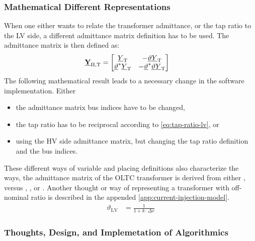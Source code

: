 \subsubsection{Mathematical Different Representations}
When one either wants to relate the transformer admittance, or the tap ratio to the \acs{LV} side, a different admittance matrix definition has to be used.
The admittance matrix is then defined as:
\begin{align}
        \underline{\mathrm{\textbf{Y}}}_\mathrm{\Pi,T}&= 
        \begin{bmatrix}
            \underline{Y}_\mathrm{T} & -\underline{\vartheta}\underline{Y}_\mathrm{T} \\
            \underline{\vartheta}^*\underline{Y}_\mathrm{T} & -\underline{\vartheta}^*\underline{\vartheta}\underline{Y}_\mathrm{T}
        \end{bmatrix} \label{eq:admittance-oltc}
    \end{align}
The following mathematical result leads to a necessary change in the software implementation.
Either 
\begin{itemize}
        \item the admittance matrix bus indices have to be changed,
        \item the tap ratio has to be reciprocal according to \autoref{eq:tap-ratio-lv}, or
        \item using the \acs{HV} side admittance matrix, but changing the tap ratio definition and the bus indices.
\end{itemize}
These different ways of variable and placing definitions also characterize the ways, the admittance matrix of the \acs{OLTC} transformer is derived from either \textcite{machowski_2020}, versus \textcite{kundur_2022}, \textcite{milano_2010}, or \textcite{burlakin_2024}.
Another thought or way of representing a transformer with off-nominal ratio is described in the appended \autoref{app:current-injection-model}.
\begin{align}
        \vartheta_\mathrm{LV} &= \frac{1}{1 + k \cdot \Delta v} \label{eq:tap-ratio-lv}
\end{align}

\subsubsection{Thoughts, Design, and Implemetation of Algorithmics}


